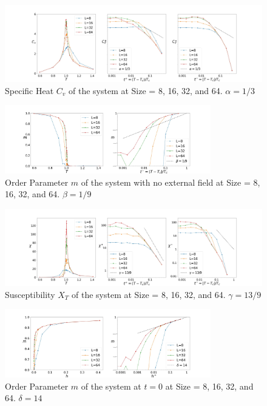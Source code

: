\documentclass[%
 reprint,
 amsmath,amssymb,
 aps,
]{revtex4-2}
\begin{document}
\begin{figure}[b]
\includegraphics[width=1\textwidth]{../fig/Alpha, Specific Heat (3-state 2D Potts).jpg}
\caption{\label{fig:alpha} Specific Heat $C_{v}$ of the system at Size = 8, 16, 32, 
and 64. $\alpha = 1/3$}
\end{figure}

\begin{figure}[b]
\includegraphics[width=0.8\textwidth]{../fig/Beta, Order Parameter (3-state 2D Potts).jpg}
\caption{\label{fig:beta} Order Parameter $m$ of the system with no external field 
at Size = 8, 16, 32, and 64. $\beta = 1/9$}
\end{figure}

\begin{figure}[b]
\includegraphics[width=1\textwidth]{../fig/Gamma, Susceptibility (3-state 2D Potts).jpg}
\caption{\label{fig:gamma} Susceptibility $X_{T}$ of the system at Size = 8, 16, 32, 
and 64. $\gamma = 13/9$}
\end{figure}

\begin{figure}[b]
\includegraphics[width=0.8\textwidth]{../fig/Delta, Order Parameter (3-state 2D Potts).jpg}
\caption{\label{fig:delta} Order Parameter $m$ of the system at $t=0$ at Size = 8, 16, 32, 
and 64. $\delta = 14$}
\end{figure}
\end{document}
